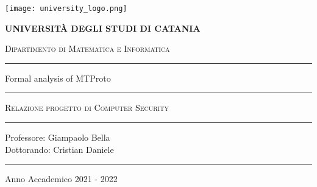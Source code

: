 \begin{titlepage}
    \centering
    \texttt{[image: university\_logo.png]}

    \bigskip

    {\Large \textbf{UNIVERSITÀ DEGLI STUDI DI CATANIA}}

    {\scshape
        \large
        Dipartimento di Matematica e Informatica
    }

    \bigskip

    \hrule

    \bigskip
    \bigskip
    \bigskip
    \bigskip

    {\itshape
        \large
        \@author
        \par}

    \bigskip
    \bigskip
    \bigskip
    \bigskip

    {\centering
        \Large
        \@title
        \par}
    \vspace{5mm}
    {\centering
        Formal analysis of MTProto
        \par}

    \bigskip
    \bigskip
    \bigskip
    \bigskip
    \bigskip
    \bigskip

    \begin{minipage}[b]{8 cm}
        \hrule
        \bigskip
        {\centering\scshape
            Relazione progetto di Computer Security
            \par}
        \bigskip
        \hrule
    \end{minipage}

    \bigskip
    \bigskip
    \bigskip
    \bigskip
    \bigskip
    \bigskip
    \bigskip
    \bigskip
    \bigskip
    \bigskip
    \bigskip

    {\raggedleft
        Professore: Giampaolo Bella \\
        Dottorando: Cristian Daniele
        \par}

    \bigskip
    \bigskip
    \bigskip
    \bigskip

    \vfill

    \hrule

    \bigskip

    {\centering
        Anno Accademico 2021 - 2022
        \par}

\end{titlepage}
